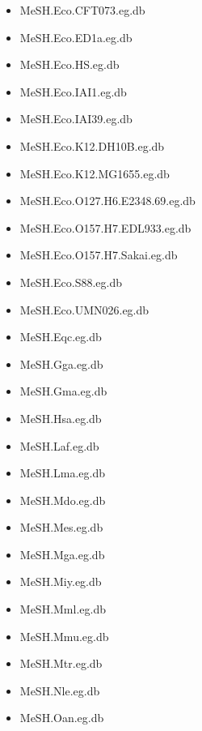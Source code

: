 \documentclass[margin,line,10pt]{res}
\newenvironment{list1}{
  \begin{list}{\ding{113}}{%
      \setlength{\itemsep}{0in}
      \setlength{\parsep}{0in} \setlength{\parskip}{0in}
      \setlength{\topsep}{0in} \setlength{\partopsep}{0in} 
      \setlength{\leftmargin}{0.17in}}}{\end{list}}
\begin{document}
\begin{resume}
\begin{list1}
\begin{multicols}{2}
\begin{itemize}
\item MeSH.Eco.CFT073.eg.db
\item MeSH.Eco.ED1a.eg.db 
\item MeSH.Eco.HS.eg.db
\item MeSH.Eco.IAI1.eg.db 
\item MeSH.Eco.IAI39.eg.db 
\item MeSH.Eco.K12.DH10B.eg.db
\item MeSH.Eco.K12.MG1655.eg.db
\item MeSH.Eco.O127.H6.E2348.69.eg.db
\item MeSH.Eco.O157.H7.EDL933.eg.db 
\item MeSH.Eco.O157.H7.Sakai.eg.db
\item MeSH.Eco.S88.eg.db
\item MeSH.Eco.UMN026.eg.db
\item MeSH.Eqc.eg.db 
\item MeSH.Gga.eg.db
\item MeSH.Gma.eg.db 
\item MeSH.Hsa.eg.db
\item MeSH.Laf.eg.db 
\item MeSH.Lma.eg.db 
\item MeSH.Mdo.eg.db 
\item MeSH.Mes.eg.db 
\item MeSH.Mga.eg.db 
\item MeSH.Miy.eg.db 
\item MeSH.Mml.eg.db 
\item MeSH.Mmu.eg.db 
\item MeSH.Mtr.eg.db 
\item MeSH.Nle.eg.db 
\item MeSH.Oan.eg.db 

\end{itemize}
\end{multicols}
\end{list1}
\end{resume}
\end{document}
